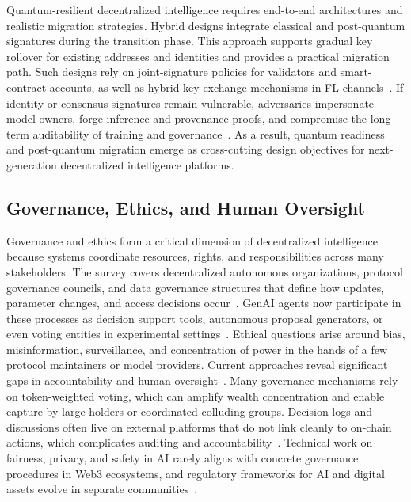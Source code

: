 \documentclass[5p,twocolumn]{elsarticle}
\begin{document}
Quantum-resilient decentralized intelligence requires end-to-end architectures and realistic migration strategies. Hybrid designs integrate classical and post-quantum signatures during the transition phase. This approach supports gradual key rollover for existing addresses and identities and provides a practical migration path. Such designs rely on joint-signature policies for validators and smart-contract accounts, as well as hybrid key exchange mechanisms in FL channels~\cite{khodaiemehr2023navigating,zhang2024pqsf,umer2025quantum}. If identity or consensus signatures remain vulnerable, adversaries impersonate model owners, forge inference and provenance proofs, and compromise the long-term auditability of training and governance~\cite{khodaiemehr2023navigating,castiglione2025enhancing}. As a result, quantum readiness and post-quantum migration emerge as cross-cutting design objectives for next-generation decentralized intelligence platforms.


\subsection{Governance, Ethics, and Human Oversight}
Governance and ethics form a critical dimension of decentralized intelligence because systems coordinate resources, rights, and responsibilities across many stakeholders. The survey covers decentralized autonomous organizations, protocol governance councils, and data governance structures that define how updates, parameter changes, and access decisions occur~\cite{dorri2018multi,wang2024sok}. GenAI agents now participate in these processes as decision support tools, autonomous proposal generators, or even voting entities in experimental settings~\cite{naraganahalli2025decentralized}. Ethical questions arise around bias, misinformation, surveillance, and concentration of power in the hands of a few protocol maintainers or model providers. Current approaches reveal significant gaps in accountability and human oversight~\cite{saleem2025responsible,tabassum2025generative}. Many governance mechanisms rely on token-weighted voting, which can amplify wealth concentration and enable capture by large holders or coordinated colluding groups. Decision logs and discussions often live on external platforms that do not link cleanly to on-chain actions, which complicates auditing and accountability~\cite{chen2023can}. Technical work on fairness, privacy, and safety in AI rarely aligns with concrete governance procedures in Web3 ecosystems, and regulatory frameworks for AI and digital assets evolve in separate communities~\cite{naraganahalli2025decentralized}.
\end{document}
